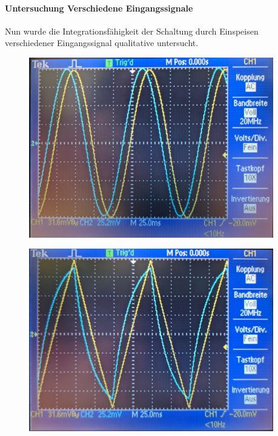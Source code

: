 \documentclass[12pt,english,ngerman]{scrartcl}
\begin{document}

\paragraph{Untersuchung Verschiedene Eingangssignale}
Nun wurde die Integrationsfähigkeit der Schaltung durch Einspeisen
verschiedener Eingangssignal qualitative untersucht.
 
\begin{figure}[H]
  \centering
    \includegraphics[width=0.95\textwidth]{./figures/integrator/sinussignal.jpg}
  \caption{}
  \label{fig:mess_integrator_sinussignal}
\end{figure}

\begin{figure}[H]
  \centering
    \includegraphics[width=0.95\textwidth]{./figures/integrator/dreiecksignal.jpg}
  \caption{}
  \label{fig:mess_integrator_dreiecksignal}
\end{figure}
\end{document}
